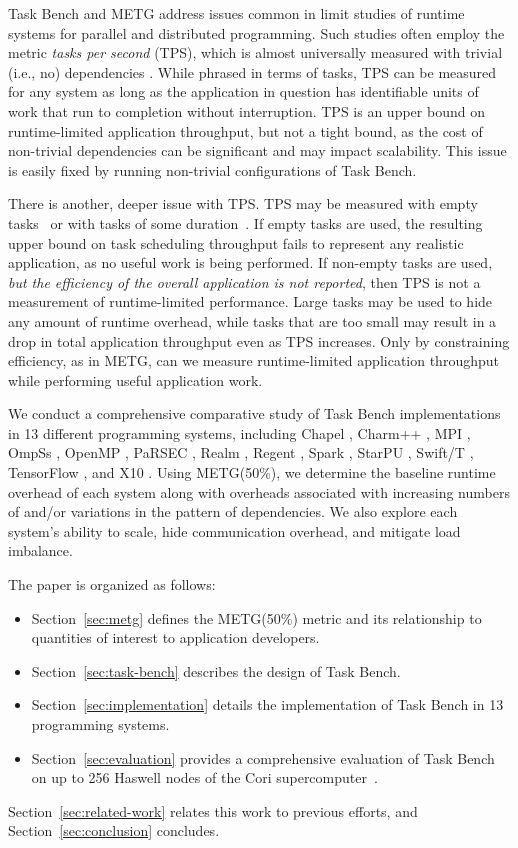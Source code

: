 Task Bench and METG address issues common in limit studies of runtime
systems for parallel and distributed programming. Such studies often
employ the metric \emph{tasks per second} (TPS), which is almost
universally measured with trivial (i.e., no) dependencies \cite{LegionTracing18, Canary16, Armstrong14}. While
phrased in terms of tasks, TPS can be measured for any system as long
as the application in question has identifiable units of work that run
to completion without interruption. TPS is an upper bound on
runtime-limited application throughput, but not a tight bound, as the
cost of non-trivial dependencies can be significant and may impact
scalability. This issue is easily fixed by running non-trivial
configurations of Task Bench.

There is another, deeper issue with TPS. TPS may be measured with
empty tasks~\cite{LegionTracing18} or with tasks of some
duration~\cite{Canary16, Armstrong14}. If empty tasks are used, the
resulting upper bound on task scheduling throughput fails to represent
any realistic application, as no
useful work is being performed. If non-empty tasks are used, \emph{but
  the efficiency of the overall application is not reported}, then TPS
is not a measurement of runtime-limited performance. Large tasks may
be used to hide any amount of runtime overhead,
while tasks that are too small may result in a drop in total
application throughput even as TPS increases. Only by constraining
efficiency, as in METG, can we measure runtime-limited application
throughput while performing useful application work.

We conduct a comprehensive comparative study of Task Bench
implementations in 13 different programming systems, including
Chapel \cite{Chapel15}, Charm++ \cite{Charmpp93}, MPI \cite{MPI},
OmpSs \cite{OmpSs11}, OpenMP \cite{OpenMPSpec40},
PaRSEC \cite{PARSEC13}, Realm \cite{Realm14}, Regent \cite{Regent15},
Spark \cite{Spark10}, StarPU \cite{StarPU11},
Swift/T \cite{Wozniak13}, TensorFlow \cite{TensorFlow15}, and
X10 \cite{X1005}. Using METG(50\%), we determine the baseline
runtime overhead of each system along with overheads associated with
increasing numbers of and/or variations in the pattern of dependencies. We
also explore each system's ability to scale, hide communication
overhead, and mitigate load imbalance.

The paper is organized as follows:

\begin{itemize}
\item Section~\ref{sec:metg} defines the METG(50\%) metric and its
  relationship to quantities of interest to application developers.
\item Section~\ref{sec:task-bench} describes the design of Task Bench.
\item Section~\ref{sec:implementation} details the implementation of
  Task Bench in 13 programming systems.
\item Section~\ref{sec:evaluation} provides a comprehensive evaluation
  of Task Bench on up to 256 Haswell nodes of the Cori
  supercomputer~\cite{Cori}.
\end{itemize}

Section~\ref{sec:related-work} relates this work to previous efforts,
and Section~\ref{sec:conclusion} concludes.

